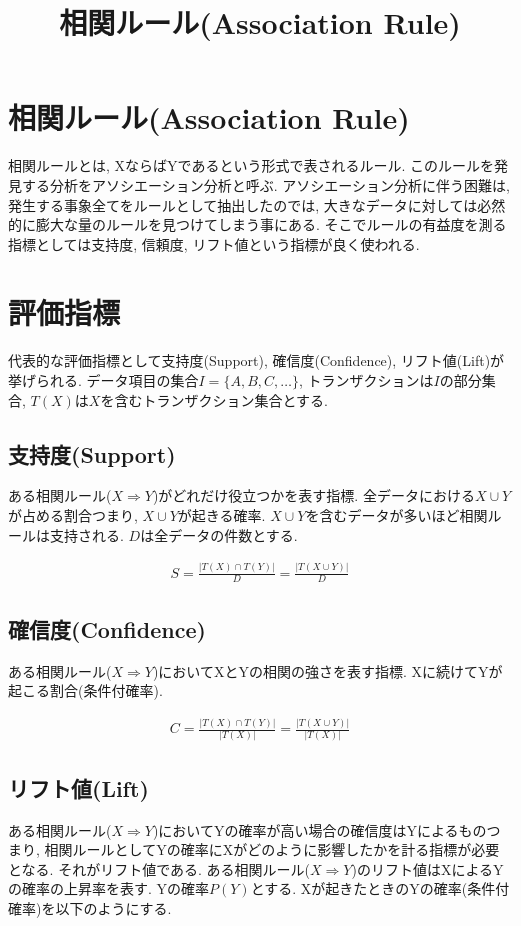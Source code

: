 \documentclass[dvipdfmx, 10pt]{jsarticle}
\title{\textbf{相関ルール(Association Rule)}}
\author{}
\date{}
\begin{document}
\maketitle

\section*{相関ルール(Association Rule)}
相関ルールとは, XならばYであるという形式で表されるルール. このルールを発見する分析をアソシエーション分析と呼ぶ. 
アソシエーション分析に伴う困難は, 発生する事象全てをルールとして抽出したのでは, 
大きなデータに対しては必然的に膨大な量のルールを見つけてしまう事にある. 
そこでルールの有益度を測る指標としては支持度, 信頼度, リフト値という指標が良く使われる. 

\section*{評価指標}
代表的な評価指標として支持度(Support), 確信度(Confidence), リフト値(Lift)が挙げられる. 
データ項目の集合\(I = \{A, B, C, \dots \}\), トランザクションは\(I\)の部分集合,  
\(T(X)\)は\(X\)を含むトランザクション集合とする. 

\subsection*{支持度(Support)}
ある相関ルール(\(X \Rightarrow Y\))がどれだけ役立つかを表す指標. 
全データにおける\(X \cup Y\)が占める割合つまり, \(X \cup Y\)が起きる確率. 
\(X \cup Y\)を含むデータが多いほど相関ルールは支持される. 
\(D\)は全データの件数とする. 

\begin{align*}
    S = \frac{|T(X) \cap T(Y)|}{D} = \frac{|T(X \cup Y)|}{D}
\end{align*}

\subsection*{確信度(Confidence)}
ある相関ルール(\(X \Rightarrow Y\))においてXとYの相関の強さを表す指標. Xに続けてYが起こる割合(条件付確率). 

\begin{align*}
    C = \frac{|T(X) \cap T(Y)|}{|T(X)|} = \frac{|T(X \cup Y)|}{|T(X)|}
\end{align*}

\subsection*{リフト値(Lift)}
ある相関ルール(\(X \Rightarrow Y\))においてYの確率が高い場合の確信度はYによるものつまり, 
相関ルールとしてYの確率にXがどのように影響したかを計る指標が必要となる. それがリフト値である. 
ある相関ルール(\(X \Rightarrow Y\))のリフト値はXによるYの確率の上昇率を表す. 
Yの確率\(P(Y)\)とする. Xが起きたときのYの確率(条件付確率)を以下のようにする. 
\end{document}
